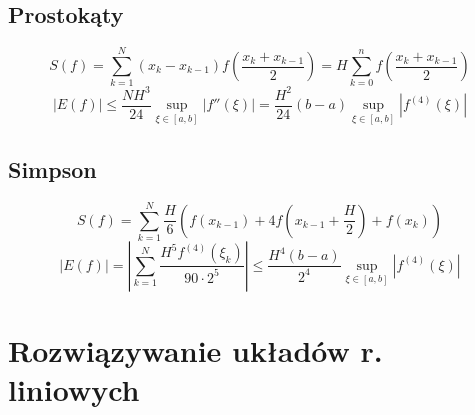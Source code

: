 \documentclass[10pt,twocolumn]{article}
\begin{document}
\begin{flushleft}
\subsection{Prostokąty}
$$S(f) = \sum_{k=1}^{N}(x_k-x_{k-1})f\left(\frac{x_k+x_{k-1}}{2}\right) = H\sum_{k=0}^{n}f(\frac{x_k + x_{k-1}}{2})$$
$$|E(f)| \leq \frac{NH^3}{24}\underset{\xi \in [a,b]}{\sup}|f''(\xi)| = \frac{H^2}{24}(b-a)\underset{\xi \in [a,b]}{\sup}|f^{(4)}(\xi)|$$
\subsection{Simpson}
$$S(f) = \sum_{k=1}^N \frac{H}{6} \left(f(x_{k-1})+4f\left(x_{k-1}+\frac{H}{2}\right)+f(x_k)\right)$$
$$|E(f)|= \left| \sum_{k=1}^N \frac{H^5f^{(4)}(\xi_k)}{90\cdot2^5}\right| \leq \frac{H^4(b-a)}{2^4}\underset{\xi \in [a,b]}{\sup}|f^{(4)}(\xi)| $$
\section{Rozwiązywanie układów r. liniowych}


\end{flushleft}
\end{document}
